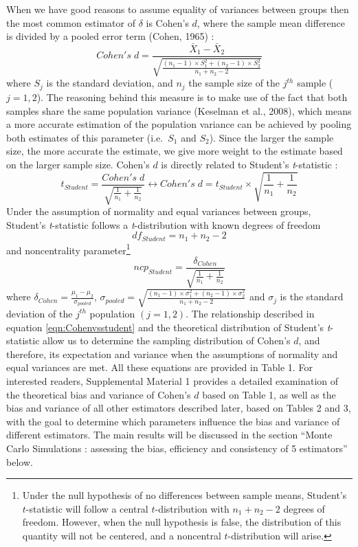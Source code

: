 \documentclass[
  english,
  man,floatsintext]{apa6}
\begin{document}
When we have good reasons to assume equality of variances between groups then the most common estimator of \(\delta\) is Cohen's \(d\), where the sample mean difference is divided by a pooled error term (Cohen, 1965) :
\begin{equation*} 
Cohen's \; d = \frac{\bar{X}_1-\bar{X}_2}{\sqrt{\frac{(n_1-1) \times S_1^2+(n_2-1) \times S_2^2}{n_1+n_2-2}}}
\label{eqn:Cohends}
\end{equation*}
where \(S_j\) is the standard deviation, and \(n_j\) the sample size of the \(j^{th}\) sample (\(j=1,2\)). The reasoning behind this measure is to make use of the fact that both samples share the same population variance (Keselman et al., 2008), which means a more accurate estimation of the population variance can be achieved by pooling both estimates of this parameter (i.e.~\(S_1\) and \(S_2\)). Since the larger the sample size, the more accurate the estimate, we give more weight to the estimate based on the larger sample size. Cohen's \(d\) is directly related to Student's \emph{t}-statistic :
\begin{equation} 
t_{Student}=\frac{Cohen's \; d}{\sqrt{\frac{1}{n_1}+\frac{1}{n_2}}}\leftrightarrow Cohen's \; d =  t_{Student} \times \sqrt{\frac{1}{n_1}+\frac{1}{n_2}}
\label{eqn:Cohenvsstudent}
\end{equation}
Under the assumption of normality and equal variances between groups, Student's \emph{t}-statistic follows a \emph{t}-distribution with known degrees of freedom
\begin{equation} 
df_{Student} = n_1+n_2-2
\label{eqn:studentdf}
\end{equation}
and noncentrality parameter\footnote{Under the null hypothesis of no differences between sample means, Student's $t$-statistic will follow a central $t$-distribution with $n_1+n_2-2$ degrees of freedom. However, when the null hypothesis is false, the distribution of this quantity will not be centered, and a noncentral $t$-distribution will arise.}
\[ncp_{Student} = \frac{\delta_{Cohen}}{\sqrt{\frac{1}{n_1}+\frac{1}{n_2}}}\]
where \(\delta_{Cohen}= \frac{\mu_1-\mu_2}{\sigma_{pooled}}\), \(\sigma_{pooled}= \sqrt{\frac{(n_1-1) \times \sigma^2_1+(n_2-1) \times \sigma^2_2}{n_1+n_2-2}}\) and \(\sigma_j\) is the standard deviation of the \(j^{th}\) population \((j=1,2)\). The relationship described in equation \ref{eqn:Cohenvsstudent} and the theoretical distribution of Student's \emph{t}-statistic allow us to determine the sampling distribution of Cohen's \(d\), and therefore, its expectation and variance when the assumptions of normality and equal variances are met. All these equations are provided in Table 1. For interested readers, Supplemental Material 1 provides a detailed examination of the theoretical bias and variance of Cohen's \(d\) based on Table 1, as well as the bias and variance of all other estimators described later, based on Tables 2 and 3, with the goal to determine which parameters influence the bias and variance of different estimators. The main results will be discussed in the section ``Monte Carlo Simulations : assessing the bias, efficiency and consistency of 5 estimators'' below.
\end{document}
